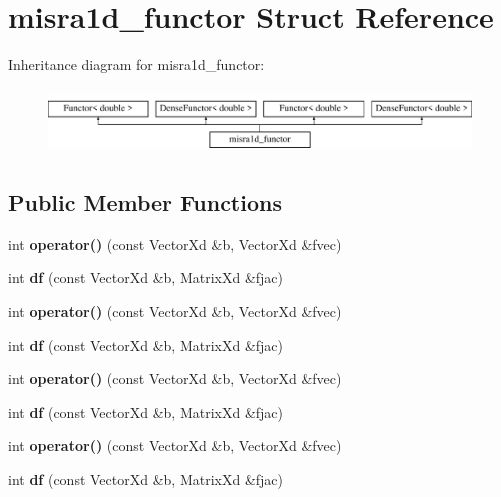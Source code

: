 \hypertarget{structmisra1d__functor}{}\section{misra1d\+\_\+functor Struct Reference}
\label{structmisra1d__functor}
Inheritance diagram for misra1d\+\_\+functor\+:\begin{figure}[H]
\begin{center}
\leavevmode
\includegraphics[height=1.728395cm]{structmisra1d__functor}
\end{center}
\end{figure}
\subsection*{Public Member Functions}
\begin{DoxyCompactItemize}
\item 
\mbox{\label{structmisra1d__functor_acdddde7cb130914f82e6a63f52fef9ab}} 
int {\bfseries operator()} (const Vector\+Xd \&b, Vector\+Xd \&fvec)
\item 
\mbox{\label{structmisra1d__functor_a53fcc7007f4e4d9c25905bbf3563014b}} 
int {\bfseries df} (const Vector\+Xd \&b, Matrix\+Xd \&fjac)
\item 
\mbox{\label{structmisra1d__functor_acdddde7cb130914f82e6a63f52fef9ab}} 
int {\bfseries operator()} (const Vector\+Xd \&b, Vector\+Xd \&fvec)
\item 
\mbox{\label{structmisra1d__functor_a53fcc7007f4e4d9c25905bbf3563014b}} 
int {\bfseries df} (const Vector\+Xd \&b, Matrix\+Xd \&fjac)
\item 
\mbox{\label{structmisra1d__functor_acdddde7cb130914f82e6a63f52fef9ab}} 
int {\bfseries operator()} (const Vector\+Xd \&b, Vector\+Xd \&fvec)
\item 
\mbox{\label{structmisra1d__functor_a53fcc7007f4e4d9c25905bbf3563014b}} 
int {\bfseries df} (const Vector\+Xd \&b, Matrix\+Xd \&fjac)
\item 
\mbox{\label{structmisra1d__functor_acdddde7cb130914f82e6a63f52fef9ab}} 
int {\bfseries operator()} (const Vector\+Xd \&b, Vector\+Xd \&fvec)
\item 
\mbox{\label{structmisra1d__functor_a53fcc7007f4e4d9c25905bbf3563014b}} 
int {\bfseries df} (const Vector\+Xd \&b, Matrix\+Xd \&fjac)
\end{DoxyCompactItemize}
